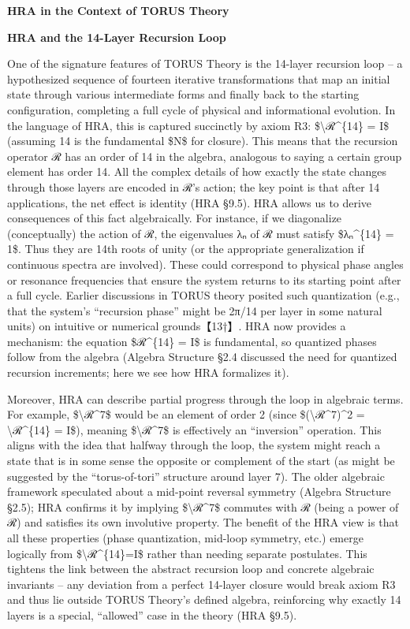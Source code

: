 \documentclass[]{article}
\begin{document}
\textbf{HRA in the Context of TORUS Theory}

\textbf{HRA and the 14-Layer Recursion Loop}

One of the signature features of TORUS Theory is the 14-layer recursion
loop -- a hypothesized sequence of fourteen iterative transformations
that map an initial state through various intermediate forms and finally
back to the starting configuration, completing a full cycle of physical
and informational evolution. In the language of HRA, this is captured
succinctly by axiom R3: \$\textbackslash{}ℛ\^{}\{14\} = I\$ (assuming 14
is the fundamental \$N\$ for closure). This means that the recursion
operator ℛ has an order of 14 in the algebra, analogous to saying a
certain group element has order 14. All the complex details of how
exactly the state changes through those layers are encoded in ℛ's
action; the key point is that after 14 applications, the net effect is
identity (HRA §9.5). HRA allows us to derive consequences of this fact
algebraically. For instance, if we diagonalize (conceptually) the action
of ℛ, the eigenvalues λₙ of ℛ must satisfy \$λₙ\^{}\{14\} = 1\$. Thus
they are 14th roots of unity (or the appropriate generalization if
continuous spectra are involved). These could correspond to physical
phase angles or resonance frequencies that ensure the system returns to
its starting point after a full cycle. Earlier discussions in TORUS
theory posited such quantization (e.g., that the system's ``recursion
phase'' might be 2π/14 per layer in some natural units) on intuitive or
numerical grounds【13†】. HRA now provides a mechanism: the equation
\$ℛ\^{}\{14\} = I\$ is fundamental, so quantized phases follow from the
algebra (Algebra Structure §2.4 discussed the need for quantized
recursion increments; here we see how HRA formalizes it).

Moreover, HRA can describe partial progress through the loop in
algebraic terms. For example, \$\textbackslash{}ℛ\^{}7\$ would be an
element of order 2 (since \$(\textbackslash{}ℛ\^{}7)\^{}2 =
\textbackslash{}ℛ\^{}\{14\} = I\$), meaning \$\textbackslash{}ℛ\^{}7\$
is effectively an ``inversion'' operation. This aligns with the idea
that halfway through the loop, the system might reach a state that is in
some sense the opposite or complement of the start (as might be
suggested by the ``torus-of-tori'' structure around layer 7). The older
algebraic framework speculated about a mid-point reversal symmetry
(Algebra Structure §2.5); HRA confirms it by implying
\$\textbackslash{}ℛ\^{}7\$ commutes with ℛ (being a power of ℛ) and
satisfies its own involutive property. The benefit of the HRA view is
that all these properties (phase quantization, mid-loop symmetry, etc.)
emerge logically from \$\textbackslash{}ℛ\^{}\{14\}=I\$ rather than
needing separate postulates. This tightens the link between the abstract
recursion loop and concrete algebraic invariants -- any deviation from a
perfect 14-layer closure would break axiom R3 and thus lie outside TORUS
Theory's defined algebra, reinforcing why exactly 14 layers is a
special, ``allowed'' case in the theory (HRA §9.5).
\end{document}
